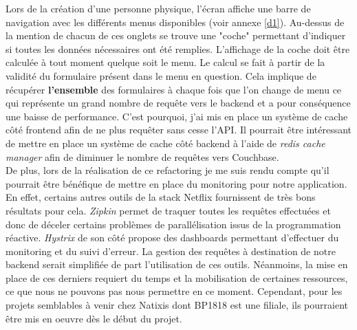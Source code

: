 	Lors de la création d'une personne physique, l'écran affiche une barre de navigation avec les différents menus disponibles (voir annexe \ref{d1}). Au-dessus de la mention de chacun de ces onglets se trouve une "coche" permettant d'indiquer si toutes les données nécessaires ont été remplies. L'affichage de la coche doit être calculée à tout moment quelque soit le menu. Le calcul se fait à partir de la validité du formulaire présent dans le menu en question. Cela implique de récupérer \textbf{l'ensemble} des formulaires à chaque fois que l'on change de menu ce qui représente un grand nombre de requête vers le backend et a pour conséquence une baisse de performance. C'est pourquoi, j'ai mis en place un système de cache côté frontend afin de ne plus requêter sans cesse l'API. Il pourrait être intéressant de mettre en place un système de cache côté backend à l'aide de \textit{redis cache manager} afin de diminuer le nombre de requêtes vers Couchbase. \\
	
	De plus, lors de la réalisation de ce refactoring je me suis rendu compte qu'il pourrait être bénéfique de mettre en place du monitoring pour notre application. En effet, certains autres outils de la stack Netflix fournissent de très bons résultats pour cela. \textit{Zipkin} permet de traquer toutes les requêtes effectuées et donc de déceler certains problèmes de parallélisation issus de la programmation réactive. \textit{Hystrix} de son côté propose des dashboards permettant d'effectuer du monitoring et du suivi d'erreur. La gestion des requêtes à destination de notre backend serait simplifiée de part l'utilisation de ces outils. Néanmoins, la mise en place de ces derniers requiert du temps et la mobilisation de certaines ressources, ce que nous ne pouvons pas nous permettre en ce moment. Cependant, pour les projets semblables à venir chez Natixis dont BP1818 est une filiale, ils pourraient être mis en oeuvre dès le début du projet.